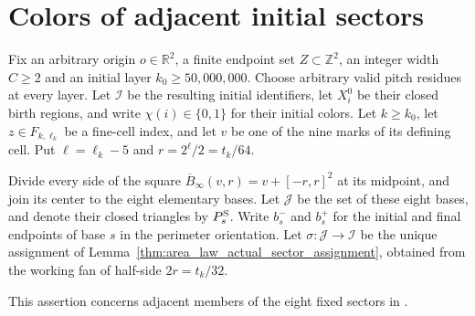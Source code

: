 \section{Colors of adjacent initial sectors}
\label{sec:area_law_initial_sector_colors}

Fix an arbitrary origin $o\in\mathbb R^2$, a finite endpoint set
$Z\subset\mathbb Z^2$, an integer width $C\ge2$ and an initial layer
$k_0\ge50{,}000{,}000$. Choose arbitrary valid pitch residues at every
layer. Let $\mathcal I$ be the resulting initial identifiers,
let $X_i^0$ be their closed birth regions, and write
$\chi(i)\in\{0,1\}$ for their initial colors.
Let $k\ge k_0$, let $z\in F_{k,\ell_k}$ be a fine-cell index,
and let $v$ be one of the nine marks of its defining cell. Put
$\ell=\ell_k-5$ and $r=2^\ell/2=t_k/64$.

Divide every side of the square
$\overline B_\infty(v,r)=v+[-r,r]^2$ at its midpoint, and join its
center to the eight elementary bases. Let $\mathcal J$ be the set
of these eight bases, and denote their closed triangles by
$P_s^{\rm S}$. Write $b_s^-$ and $b_s^+$ for the initial and final
endpoints of base $s$ in the perimeter orientation. Let
$\sigma:\mathcal J\to\mathcal I$ be the unique assignment
of Lemma~\ref{thm:area_law_actual_sector_assignment}, obtained
from the working fan of half-side $2r=t_k/32$.

This assertion concerns adjacent members of the eight fixed sectors
in \cite[Section~11]{OpenAI2026AreaLaw}.


